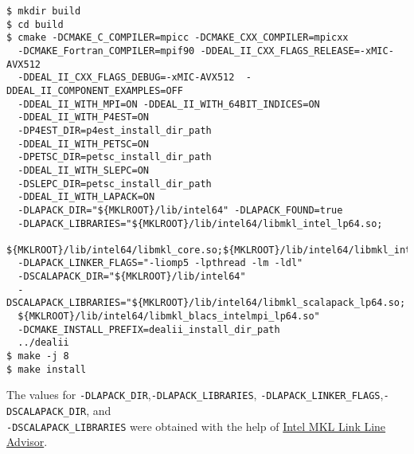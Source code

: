 \begin{verbatim}
$ mkdir build
$ cd build
$ cmake -DCMAKE_C_COMPILER=mpicc -DCMAKE_CXX_COMPILER=mpicxx 
  -DCMAKE_Fortran_COMPILER=mpif90 -DDEAL_II_CXX_FLAGS_RELEASE=-xMIC-AVX512 
  -DDEAL_II_CXX_FLAGS_DEBUG=-xMIC-AVX512  -DDEAL_II_COMPONENT_EXAMPLES=OFF
  -DDEAL_II_WITH_MPI=ON -DDEAL_II_WITH_64BIT_INDICES=ON
  -DDEAL_II_WITH_P4EST=ON
  -DP4EST_DIR=p4est_install_dir_path
  -DDEAL_II_WITH_PETSC=ON 
  -DPETSC_DIR=petsc_install_dir_path
  -DDEAL_II_WITH_SLEPC=ON
  -DSLEPC_DIR=petsc_install_dir_path
  -DDEAL_II_WITH_LAPACK=ON
  -DLAPACK_DIR="${MKLROOT}/lib/intel64" -DLAPACK_FOUND=true
  -DLAPACK_LIBRARIES="${MKLROOT}/lib/intel64/libmkl_intel_lp64.so;
  ${MKLROOT}/lib/intel64/libmkl_core.so;${MKLROOT}/lib/intel64/libmkl_intel_thread.so" 
  -DLAPACK_LINKER_FLAGS="-liomp5 -lpthread -lm -ldl"
  -DSCALAPACK_DIR="${MKLROOT}/lib/intel64"
  -DSCALAPACK_LIBRARIES="${MKLROOT}/lib/intel64/libmkl_scalapack_lp64.so;
  ${MKLROOT}/lib/intel64/libmkl_blacs_intelmpi_lp64.so"
  -DCMAKE_INSTALL_PREFIX=dealii_install_dir_path
  ../dealii
$ make -j 8
$ make install
\end{verbatim}
The values for \verb|-DLAPACK_DIR|,\verb|-DLAPACK_LIBRARIES|, \verb|-DLAPACK_LINKER_FLAGS|,\verb|-DSCALAPACK_DIR|, and\\ \verb|-DSCALAPACK_LIBRARIES| were obtained with the help of \href{https://software.intel.com/en-us/articles/intel-mkl-link-line-advisor}{Intel MKL Link Line Advisor}.\\ 


